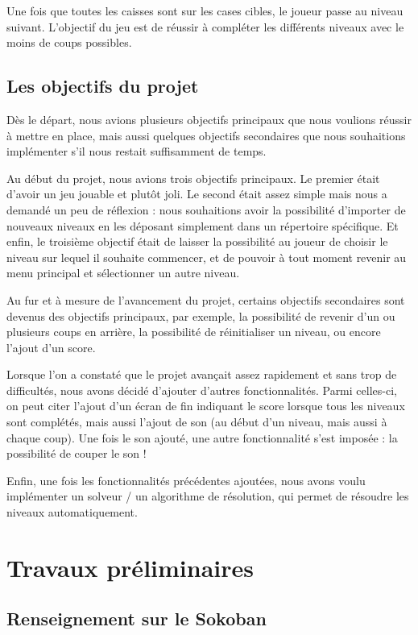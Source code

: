 \documentclass[a4paper,12pt]{article} %
\begin{document}
Une fois que toutes les caisses sont sur les cases cibles, le joueur passe au niveau suivant. L'objectif du jeu est de réussir à compléter les différents niveaux avec le moins de coups possibles.

\subsection{Les objectifs du projet}

Dès le départ, nous avions plusieurs objectifs principaux que nous voulions réussir à mettre en place, mais aussi quelques objectifs secondaires que nous souhaitions implémenter s'il nous restait suffisamment de temps.

Au début du projet, nous avions trois objectifs principaux. Le premier était d'avoir un jeu jouable et plutôt joli. Le second était assez simple mais nous a demandé un peu de réflexion : nous souhaitions avoir la possibilité d'importer de nouveaux niveaux en les déposant simplement dans un répertoire spécifique. Et enfin, le troisième objectif était de laisser la possibilité au joueur de choisir le niveau sur lequel il souhaite commencer, et de pouvoir à tout moment revenir au menu principal et sélectionner un autre niveau.

Au fur et à mesure de l'avancement du projet, certains objectifs secondaires sont devenus des objectifs principaux, par exemple, la possibilité de revenir d'un ou plusieurs coups en arrière, la possibilité de réinitialiser un niveau, ou encore l'ajout d'un score.

Lorsque l'on a constaté que le projet avançait assez rapidement et sans trop de difficultés, nous avons décidé d'ajouter d'autres fonctionnalités. Parmi celles-ci, on peut citer l'ajout d'un écran de fin indiquant le score lorsque tous les niveaux sont complétés, mais aussi l'ajout de son (au début d'un niveau, mais aussi à chaque coup). Une fois le son ajouté, une autre fonctionnalité s'est imposée : la possibilité de couper le son !

Enfin, une fois les fonctionnalités précédentes ajoutées, nous avons voulu implémenter un solveur / un algorithme de résolution, qui permet de résoudre les niveaux automatiquement.

\section{Travaux préliminaires}

\subsection{Renseignement sur le Sokoban} 
\end{document}
